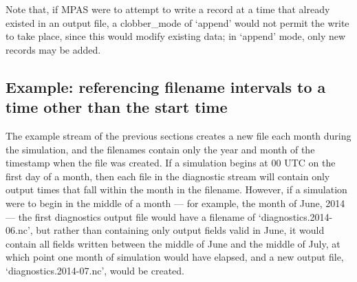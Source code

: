 \vspace{12pt}
 \newline
\hspace*{\mutindent}{\tt type="output"} \newline
\hspace*{\mutindent}{\tt filename\_template="diagnostics.\$Y-\$M.nc"} \newline
\hspace*{\mutindent}{\tt filename\_interval="01-00\_00:00:00"} \newline
\hspace*{\mutindent}{\tt precision="single"} \newline
\hspace*{\mutindent}{\tt clobber\_mode="append"} \newline
\hspace*{\mutindent}{\tt output\_interval="6:00:00" />} \newline
\newline
\hspace*{1cm}{\tt <var name="u10"/>} \newline
\hspace*{1cm}{\tt <var name="v10"/>} \newline
\hspace*{1cm}{\tt <var name="t2"/>} \newline
\hspace*{1cm}{\tt <var name="q2"/>} \newline
\newline
{} \newline
\vspace{12pt}

Note that, if MPAS were to attempt to write a record at a time that already existed in an output file, a clobber\_mode 
of `append' would not permit the write to take place, since this would modify existing data; in `append' mode, only new
records may be added.

\subsection{Example: referencing filename intervals to a time other than the start time}
\label{sec:reference_time_example}

The example stream of the previous sections creates a new file each month during the simulation, and the filenames
contain only the year and month of the timestamp when the file was created. If a simulation begins at 00 UTC on the
first day of a month, then each file in the diagnostic stream will contain only output times that fall within the month
in the filename. However, if a simulation were to begin in the middle of a month --- for example, the month of June, 2014 --- 
the first diagnostics output file would have a filename of `diagnostics.2014-06.nc', but rather than containing only output
fields valid in June, it would contain all fields written between the middle of June and the middle of July, at which point
one month of simulation would have elapsed, and a new output file, `diagnostics.2014-07.nc', would be created.


